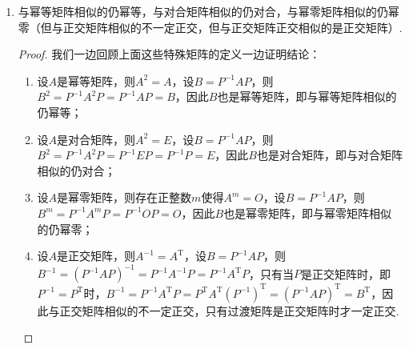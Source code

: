 \begin{enumerate}
          \begin{proof}
              设$B=P^{-1}AP$，则$|\lambda E-B|=|\lambda E-P^{-1}AP|=|P^{-1}(\lambda E-A)P|=|P^{-1}||\lambda E-A||P|=|\lambda E-A|$. 因此$A\sim B$有$|\lambda E-A|=|\lambda E-B|$.

              我们知道特征多项式相同则特征值相同，迹等于所有特征值之和，行列式等于所有特征值之积，因此相似矩阵有相同的迹，行列式，特征值.

              相似矩阵来源于同一线性变换在不同基下的表示，因此它们的特征向量是线性变换的特征向量在不同基下的坐标，因此不一定相同.
          \end{proof}
    \item 与幂等矩阵相似的仍幂等，与对合矩阵相似的仍对合，与幂零矩阵相似的仍幂零（但与正交矩阵相似的不一定正交，但与正交矩阵正交相似的是正交矩阵）.

          \begin{proof}
              我们一边回顾上面这些特殊矩阵的定义一边证明结论：
              \begin{enumerate}
                  \item 设$A$是幂等矩阵，则$A^2=A$，设$B=P^{-1}AP$，则$B^2=P^{-1}A^2P=P^{-1}AP=B$，因此$B$也是幂等矩阵，即与幂等矩阵相似的仍幂等；

                  \item 设$A$是对合矩阵，则$A^2=E$，设$B=P^{-1}AP$，则$B^2=P^{-1}A^2P=P^{-1}EP=P^{-1}P=E$，因此$B$也是对合矩阵，即与对合矩阵相似的仍对合；

                  \item 设$A$是幂零矩阵，则存在正整数$m$使得$A^m=O$，设$B=P^{-1}AP$，则$B^m=P^{-1}A^mP=P^{-1}OP=O$，因此$B$也是幂零矩阵，即与幂零矩阵相似的仍幂零；

                  \item 设$A$是正交矩阵，则$A^{-1}=A^\mathrm{T}$，设$B=P^{-1}AP$，则$B^{-1}=(P^{-1}AP)^{-1}=P^{-1}A^{-1}P=P^{-1}A^\mathrm{T}P$，只有当$P$是正交矩阵时，即$P^{-1}=P^\mathrm{T}$时，$B^{-1}=P^{-1}A^\mathrm{T}P=P^\mathrm{T}A^\mathrm{T}(P^{-1})^\mathrm{T}=(P^{-1}AP)^\mathrm{T}=B^\mathrm{T}$，因此与正交矩阵相似的不一定正交，只有过渡矩阵是正交矩阵时才一定正交.
              \end{enumerate}
          \end{proof}
\end{enumerate}

